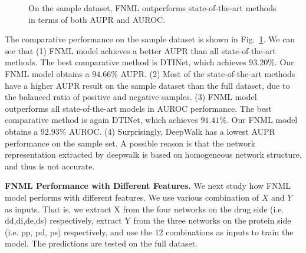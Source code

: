 \documentclass[journal]{IEEEtran}
\begin{document}
\begin{figure}[ht]
\centering
{}
\caption{On the sample dataset, FNML outperforms state-of-the-art methods in terms of both AUPR and AUROC.}\label{fig:sample}

\end{figure}

The comparative performance on the sample dataset is shown in Fig.~\ref{fig:sample}. We can see that (1) FNML model achieves a better AUPR than all state-of-the-art methods. The best comparative method is DTINet, which achieves $93.20\%$. Our FNML model obtains a $94.66\%$ AUPR. (2) Most of the state-of-the-art methods have a higher AUPR result on the sample dataset than the full dataset, due to the balanced ratio of positive and negative samples. (3) FNML model outperforms all state-of-the-art models in AUROC performance.  The best comparative method is again DTINet, which achieves $91.41\%$. Our FNML model obtains a $92.93\%$ AUROC. (4) Surprisingly, DeepWalk has a lowest AUPR performance on the sample set. A possible reason is that the network representation extracted by deepwalk is based on homogeneous network structure, and thus is not accurate. 

\textbf{FNML Performance with Different Features.} We next study how FNML model performs with different features. We use various combination of $X$ and $Y$ as inputs. That is, we extract X from the four networks on the drug side (i.e. dd,di,de,ds) respectively, extract Y from the three networks on the protein side (i.e. pp, pd, ps) respectively, and use the $12$ combinations as inputs to train the model. The predictions are tested on the full dataset.
\end{document}
